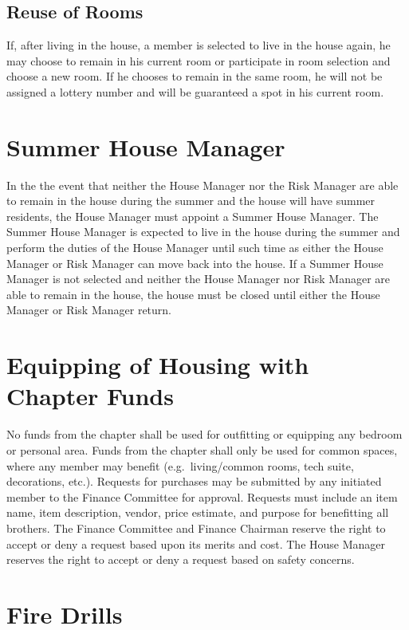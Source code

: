 \subsection{Reuse of Rooms}

If, after living in the house, a member is selected to live in the house again,
he may choose to remain in his current room or participate in room selection
and choose a new room.
If he chooses to remain in the same room, he will not be assigned a lottery
number and will be guaranteed a spot in his current room.

\section{Summer House Manager}

In the the event that neither the House Manager nor the Risk Manager are able
to remain in the house during the summer and the house will have summer
residents, the House Manager must appoint a Summer House Manager.
The Summer House Manager is expected to live in the house during the summer and
perform the duties of the House Manager until such time as either the House
Manager or Risk Manager can move back into the house.
If a Summer House Manager is not selected and neither the House Manager nor
Risk Manager are able to remain in the house, the house must be closed until
either the House Manager or Risk Manager return.

\section{Equipping of Housing with Chapter Funds}
\label{sec:equipping-of-housing-with-chapter-funds}

No funds from the chapter shall be used for outfitting or equipping any bedroom
or personal area.
Funds from the chapter shall only be used for common spaces, where any member
may benefit (e.g.\ living/common rooms, tech suite, decorations, etc.).
Requests for purchases may be submitted by any initiated member to the Finance
Committee for approval.
Requests must include an item name, item description, vendor, price estimate,
and purpose for benefitting all brothers.
The Finance Committee and Finance Chairman reserve the right to accept or deny
a request based upon its merits and cost.
The House Manager reserves the right to accept or deny a request based on
safety concerns.


\section{Fire Drills}
\label{sec:fire-drills}

